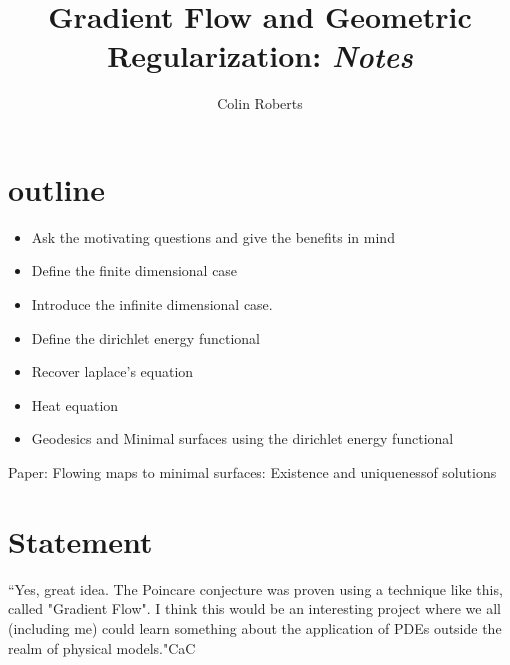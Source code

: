 \documentclass[12pt]{report} %
\title{Gradient Flow and Geometric Regularization: \emph{Notes}}
\author{Colin Roberts}
\theoremstyle{definition}
\begin{document}
\maketitle


\section{outline}


\begin{itemize}
    \item Ask the motivating questions and give the benefits in mind
    \item Define the finite dimensional case
    \item Introduce the infinite dimensional case.
    \item Define the dirichlet energy functional
    \item Recover laplace's equation
    \item Heat equation
    \item Geodesics and Minimal surfaces using the dirichlet energy functional
\end{itemize}

Paper: Flowing maps to minimal surfaces: Existence and uniquenessof solutions

\section{Statement}

``Yes, great idea. The Poincare conjecture was proven using a technique
like this, called "Gradient Flow". I think this would be an interesting
project where we all (including me) could learn something about the
application of PDEs outside the realm of physical models."CaC
\end{document}
